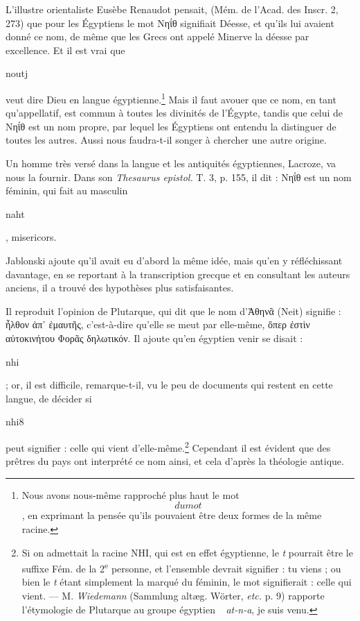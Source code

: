 \documentclass[letterpaper,twocolumn,openany,nodeprecatedcode]{dndbook}
\newcommand*\hieroAAAH{}
\newcommand*\hieroAAAQ{}
\newcommand*\hieroAAKE{}
\newcommand*\hieroABEX{}
\newcommand*\hieroABFF{}
\begin{document}
L'illustre orientaliste Eusèbe Renaudot pensait, (Mém. de l'Acad. des Inscr. 2, 273) que pour les Égyptiens le mot Νηΐθ signifiait Déesse, et qu'ils lui avaient donné ce nom, de même que les Grecs ont appelé Minerve la déesse par excellence. Et il est vrai que \begin{coptic}noutj\end{coptic} veut dire Dieu en langue égyptienne.\footnote{Nous avons nous-même rapproché plus haut le mot $\hieroAAAQ$ du mot $\hieroABEX$, en exprimant la pensée qu'ils pouvaient être deux formes de la même racine.} Mais il faut avouer que ce nom, en tant qu'appellatif, est commun à toutes les divinités de l'Égypte, tandis que celui de Νηΐθ est un nom propre, par lequel les Égyptiens ont entendu la distinguer de toutes les autres. Aussi nous faudra-t-il songer à chercher une autre origine.

Un homme très versé dans la langue et les antiquités égyptiennes, Lacroze, va nous la fournir. Dans son \emph{Thesaurus epistol.} T. 3, p. 155, il dit : Νηΐθ est un nom féminin, qui fait au masculin \begin{coptic}naht\end{coptic}, misericors.

Jablonski ajoute qu'il avait eu d'abord la même idée, mais qu'en y réfléchissant davantage, en se reportant à la transcription grecque et en consultant les auteurs anciens, il a trouvé des hypothèses plus satisfaisantes.

Il reproduit l'opinion de Plutarque, qui dit que le nom d'Ἀθηνᾶ (Neit) signifie : ἦλθον ἀπ᾿ ἐμαυτῆς, c'est-à-dire qu'elle se meut par elle-même, ὅπερ ἐστὶν αὐτοκινήτου Φορᾶς δηλωτικόν. Il ajoute qu'en égyptien venir se disait : \begin{coptic}nhi\end{coptic} ; or, il est difficile, remarque-t-il, vu le peu de documents qui restent en cette langue, de décider si \begin{coptic}nhi8\end{coptic} peut signifier : celle qui vient d'elle-même.\footnote{Si on admettait la racine NHI, qui est en effet égyptienne, le \emph{t} pourrait être le suffixe Fém. de la 2\textsuperscript{e} personne, et l'ensemble devrait signifier : tu viens ; ou bien le \emph{t} étant simplement la marqué du féminin, le mot signifierait : celle qui vient. --- M. \emph{Wiedemann} (Sammlung altæg. Wörter, \emph{etc.} p. 9) rapporte l'étymologie de Plutarque au groupe égyptien $\hieroAAAH\:\hieroABFF\:\hieroAAKE$ \emph{at-n-a}, je suis venu.} Cependant il est évident que des prêtres du pays ont interprété ce nom ainsi, et cela d'après la théologie antique.
\end{document}
